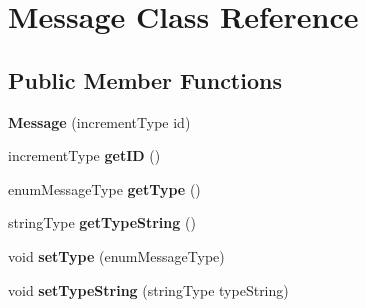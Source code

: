 \hypertarget{classMessage}{\section{Message Class Reference}
\label{classMessage}
}
\subsection*{Public Member Functions}
\begin{DoxyCompactItemize}
\item 
\hypertarget{classMessage_a4763f2af1da0ba21b6f3e32b9bdc9595}{{\bfseries Message} (increment\-Type id)}\label{classMessage_a4763f2af1da0ba21b6f3e32b9bdc9595}

\item 
\hypertarget{classMessage_a56889f0678ec78862ed392a5ff62d4b6}{increment\-Type {\bfseries get\-I\-D} ()}\label{classMessage_a56889f0678ec78862ed392a5ff62d4b6}

\item 
\hypertarget{classMessage_aa5f671241ce1da813fada6485eaf0a2f}{enum\-Message\-Type {\bfseries get\-Type} ()}\label{classMessage_aa5f671241ce1da813fada6485eaf0a2f}

\item 
\hypertarget{classMessage_a45f926cb0e25f42eba88639583faf2c4}{string\-Type {\bfseries get\-Type\-String} ()}\label{classMessage_a45f926cb0e25f42eba88639583faf2c4}

\item 
\hypertarget{classMessage_ac3e71943dd14d265593c35f04b4d82b2}{void {\bfseries set\-Type} (enum\-Message\-Type)}\label{classMessage_ac3e71943dd14d265593c35f04b4d82b2}

\item 
\hypertarget{classMessage_ae41488943ae1ca6184e919578e44b03d}{void {\bfseries set\-Type\-String} (string\-Type type\-String)}\label{classMessage_ae41488943ae1ca6184e919578e44b03d}

\end{DoxyCompactItemize}
